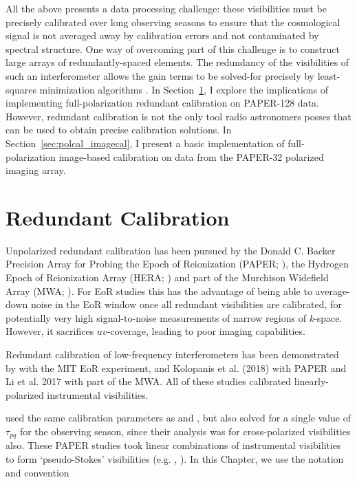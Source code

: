 All the above presents a data processing challenge: these visibilities must be precisely calibrated over long observing seasons to ensure that the cosmological signal is not averaged away by calibration errors and not contaminated by spectral structure. One way of overcoming part of this challenge is to construct large arrays of redundantly-spaced elements. The redundancy of the visibilities of such an interferometer allows the gain terms to be solved-for precisely by least-squares minimization algorithms \citep{Liu.10}. In Section~\ref{sec:polcal_redcal}, I explore the implications of implementing full-polarization redundant calibration on PAPER-128 data. However, redundant calibration is not the only tool radio astronomers posses that can be used to obtain precise calibration solutions. In Section~\ref{sec:polcal_imagecal}, I present a basic implementation of full-polarization image-based calibration on data from the PAPER-32 polarized imaging array.

\section{Redundant Calibration}
\label{sec:polcal_redcal}

Unpolarized redundant calibration has been pursued by the Donald C. Backer Precision Array for Probing the Epoch of Reionization (PAPER; \citet{Parsons.10}), the Hydrogen Epoch of Reionization Array (HERA; \citet{deBoer.17}) and part of the Murchison Widefield Array (MWA; \citet{Tingay.13}). For EoR studies this has the advantage of being able to average-down noise in the EoR window once all redundant visibilities are calibrated, for potentially very high signal-to-noise measurements of narrow regions of \textit{k}-space. However, it sacrifices $uv$-coverage, leading to poor imaging capabilities.

Redundant calibration of low-frequency interferometers has been demonstrated by \citet{Zheng.14} with the MIT EoR experiment, \citet{Parsons.14, Jacobs.15, Ali.15}  and {\color{red} Kolopanis et al. (2018)} with PAPER and {\color{red} Li et al. 2017} with part of the MWA. All of these studies calibrated linearly-polarized instrumental visibilities. 

\citet{Moore.17} used the same calibration parameters as \citet{Parsons.14} and \citet{Jacobs.15}, but also solved for a single value of $\tau_{pq}$ for the observing season, since their analysis was for cross-polarized visibilities also. These PAPER studies took linear combinations of instrumental visibilities to form `pseudo-Stokes' visibilities (e.g. \citet{TMS}, \citet{Moore.13}). In this Chapter, we use the notation and convention

